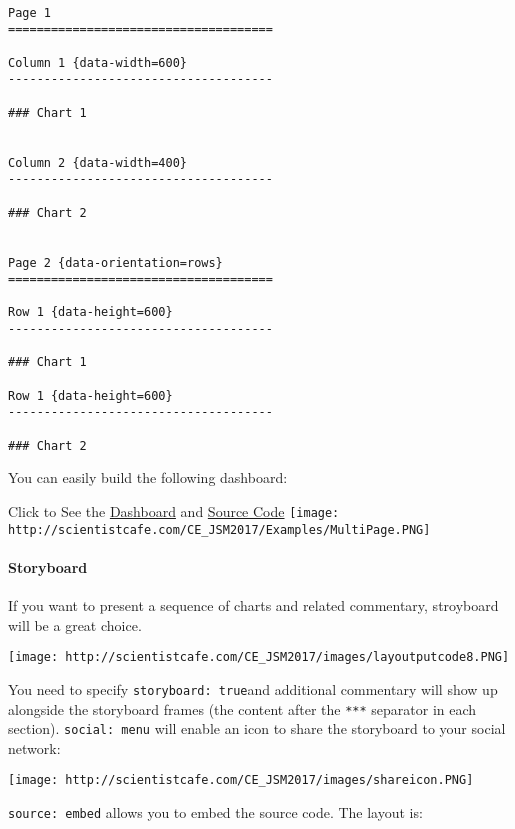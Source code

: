 \documentclass[
]{article}
\begin{document}
\begin{verbatim}

Page 1
=====================================  
    
Column 1 {data-width=600}
-------------------------------------
    
### Chart 1
    

Column 2 {data-width=400}
-------------------------------------
   
### Chart 2


Page 2 {data-orientation=rows}
=====================================     
   
Row 1 {data-height=600}
-------------------------------------

### Chart 1

Row 1 {data-height=600}
-------------------------------------

### Chart 2
\end{verbatim}

You can easily build the following dashboard:

Click to See the
\href{http://scientistcafe.com/CE_JSM2017/Examples/dashboard_multi-page.html}{Dashboard}
and
\href{https://raw.githubusercontent.com/happyrabbit/linhui.org/gh-pages/CE_JSM2017/Examples/dashboard_multi-page.Rmd}{Source
Code}
\texttt{[image: http://scientistcafe.com/CE\_JSM2017/Examples/MultiPage.PNG]}

\hypertarget{storyboard}{%
\paragraph{Storyboard}\label{storyboard}}

If you want to present a sequence of charts and related commentary,
stroyboard will be a great choice.

\texttt{[image: http://scientistcafe.com/CE\_JSM2017/images/layoutputcode8.PNG]}

You need to specify \texttt{storyboard:\ true}and additional commentary
will show up alongside the storyboard frames (the content after the
\texttt{***} separator in each section). \texttt{social:\ menu} will
enable an icon to share the storyboard to your social network:

\texttt{[image: http://scientistcafe.com/CE\_JSM2017/images/shareicon.PNG]}

\texttt{source:\ embed} allows you to embed the source code. The layout
is:
\end{document}
